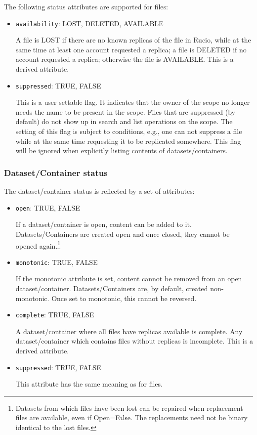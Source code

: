 \documentclass{atlasnote}
\begin{document}
The following status attributes are supported for files:

\begin{itemize}
\item{} \texttt{availability}: LOST, DELETED, AVAILABLE

A file is LOST if there are no known replicas of the file in Rucio, while at the same time at least one account requested a replica; a file is DELETED if no account requested a replica; otherwise the file is AVAILABLE. This is a derived attribute.

\item{} \texttt{suppressed}: TRUE, FALSE

This is a user settable flag. It indicates that the owner of the scope no longer needs the name to be present in the scope. Files that are suppressed (by default) do not show up in search and list operations on the scope. The setting of this flag is subject to conditions, e.g., one can not suppress a file while at the same time requesting it to be replicated somewhere. This flag will be ignored when explicitly listing contents of datasets/containers.
\end{itemize}

\subsubsection{Dataset/Container status}
\label{sec:dataset-container-status}

\label{sec:status}
The dataset/container status is reflected by a set of attributes:

\begin{itemize}
\item{} \texttt{open}: TRUE, FALSE

If a dataset/container is open, content can be added to it. Datasets/Containers are created open and once closed, they cannot be opened again.\footnote{Datasets from which files have been lost can be repaired when replacement files are available, even if Open=False. The replacements need not be binary identical to the lost files.}

\item{} \texttt{monotonic}: TRUE, FALSE

If the monotonic attribute is set, content cannot be removed from an open dataset/container. Datasets/Containers are, by default, created non-monotonic. Once set to monotonic, this cannot be reversed.

\item{} \texttt{complete}: TRUE, FALSE

A dataset/container where all files have replicas available is complete. Any dataset/container which contains files without replicas is incomplete. This is a derived attribute.

\item{} \texttt{suppressed}: TRUE, FALSE

This attribute has the same meaning as for files.
\end{itemize}
\end{document}
